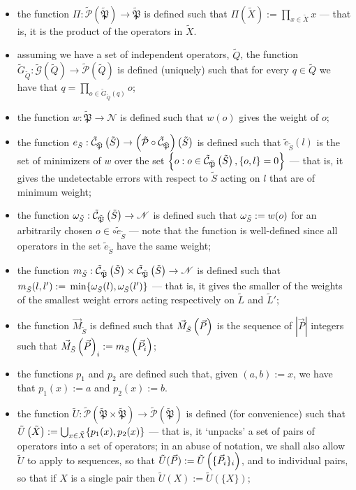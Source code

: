 \documentclass[twocolumn,showpacs,preprintnumbers,amsmath,amssymb,nofootinbib,pra,floatfix]{revtex4-1}
\newenvironment{definition}[1][Definition]{\begin{trivlist}
\item[\hskip \labelsep {\bfseries #1}]}{\end{trivlist}}
\newcommand{\lst}{\vec}
\newcommand{\set}{\tilde}
\newcommand{\genfun}{\tilde{\mathcal{G}}}
\newcommand{\pauligroup}{{\set{\mathfrak{P}}}}
\newcommand{\powerset}{\set{\mathcal{P}}}
\newcommand{\centralizer}{\set{\mathcal{C}}}
\begin{document}
\begin{definition}
$\quad$

\begin{itemize}
\item the function $\Pi:\powerset(\pauligroup)\to\pauligroup$ is defined such that $\Pi(\set X):=\prod_{x\in \set X} x$ --- that is, it is the product of the operators in $\set X$.
\item assuming we have a set of independent operators, $\set Q$, the function $\set G_{\set Q}:\genfun(\set Q)\to\powerset(\set Q)$ is defined (uniquely) such that for every $q\in\set Q$ we have that $q=\prod_{o\in\set G_{\set Q}(q)} o$;
\item the function $w:\pauligroup\to \mathscr{N}$ is defined such that $w(o)$ gives the weight of $o$;
\item the function $e_{\set S}:\centralizer_\pauligroup\paren{\set S}\to \paren{\powerset\circ\centralizer_\pauligroup}\paren{\set S}$ is defined such that $\set e_{\set S}(l)$ is the set of minimizers of $w$ over the set $\left\{o: o\in \centralizer_\pauligroup\paren{\set S}, \{o,l\}=0\right\}$ --- that is, it gives the undetectable errors with respect to $\set S$ acting on $l$ that are of minimum weight;
\item the function $\om_{\set S}:\centralizer_\pauligroup\paren{\set S}\to\mathscr{N}$ is defined such that $\om_{\set S}:=w(o)$ for an arbitrarily chosen $o\in\circ \set e_{\set S}$ --- note that the function is well-defined since all operators in the set $\set e_{\set S}$ have the same weight;
\item the function $m_{\set S}:\centralizer_\pauligroup\paren{\set S}\times \centralizer_\pauligroup\paren{\set S} \to \mathscr{N}$ is defined such that $m_{\set S}(l,l'):=\min \{\om_{\set S}(l),\om_{\set S}(l')\}$ --- that is, it gives the smaller of the weights of the smallest weight errors acting respectively on $\set L$ and $\set L'$;
\item the function $\lst M_{\set S}$ is defined such that $\lst M_{\set S}\paren{\lst P}$ is the sequence of $|\lst P|$ integers such that $\lst M_{\set S}\paren{\lst P}_i := m_{\set S}\paren{\lst P_i}$;
\item the functions $p_1$ and $p_2$ are defined such that, given $(a,b):=x$, we have that $p_1(x):=a$ and $p_2(x):=b$.
\item the function $\set U:\powerset(\pauligroup\times\pauligroup)\to\powerset(\pauligroup)$ is defined (for convenience) such that $\set U\paren{\set X}:=\bigcup_{x\in\set X} \{p_1(x),p_2(x)\}$ --- that is, it `unpacks' a set of pairs of operators into a set of operators;  in an abuse of notation, we shall also allow $\set U$ to apply to sequences, so that $\set U(\lst P) := \set U\paren{\{\lst P_i\}_i}$, and to individual pairs, so that if $X$ is a single pair then $\set U(X) := \set U(\{X\})$;

\end{itemize}
\end{definition}
\end{document}
